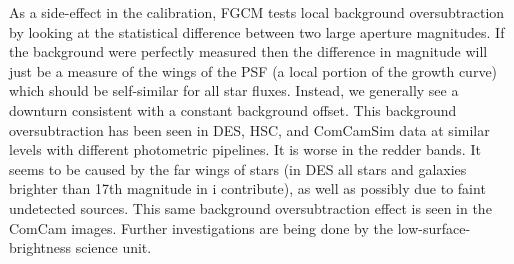 
As a side-effect in the calibration, FGCM tests local background
oversubtraction by looking at the statistical difference between two large
aperture magnitudes.  If the background were perfectly measured then the
difference in magnitude will just be a measure of the wings of the PSF (a local
portion of the growth curve) which should be self-similar for all star fluxes.
Instead, we generally see a downturn consistent with a constant background
offset.  This background oversubtraction has been seen in DES, HSC, and
ComCamSim data at similar levels with different photometric pipelines.  It is
worse in the redder bands.  It seems to be caused by the far wings of stars (in
DES all stars and galaxies brighter than 17th magnitude in i contribute), as
well as possibly due to faint undetected sources.  This same background
oversubtraction effect is seen in the ComCam images.  Further investigations
are being done by the low-surface-brightness science unit.

